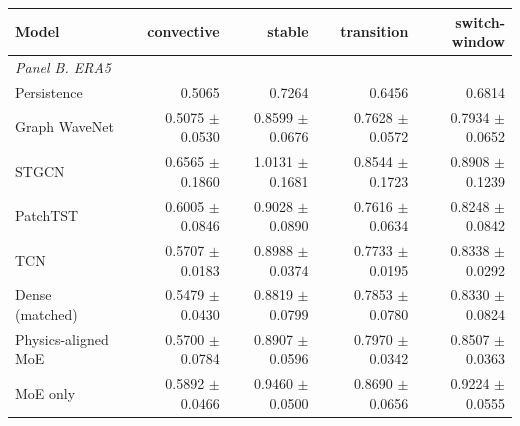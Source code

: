 \begin{table}[t]
\vspace{0.45em}
\begin{tabular}{lrrrr}
\toprule
Model & convective & stable & transition & switch-window \\
\midrule
\multicolumn{5}{l}{\textit{Panel B. ERA5}} \\
Persistence & 0.5065 & 0.7264 & 0.6456 & 0.6814 \\
Graph WaveNet & 0.5075 $\pm$ 0.0530 & 0.8599 $\pm$ 0.0676 & 0.7628 $\pm$ 0.0572 & 0.7934 $\pm$ 0.0652 \\
STGCN & 0.6565 $\pm$ 0.1860 & 1.0131 $\pm$ 0.1681 & 0.8544 $\pm$ 0.1723 & 0.8908 $\pm$ 0.1239 \\
PatchTST & 0.6005 $\pm$ 0.0846 & 0.9028 $\pm$ 0.0890 & 0.7616 $\pm$ 0.0634 & 0.8248 $\pm$ 0.0842 \\
TCN & 0.5707 $\pm$ 0.0183 & 0.8988 $\pm$ 0.0374 & 0.7733 $\pm$ 0.0195 & 0.8338 $\pm$ 0.0292 \\
Dense (matched) & 0.5479 $\pm$ 0.0430 & 0.8819 $\pm$ 0.0799 & 0.7853 $\pm$ 0.0780 & 0.8330 $\pm$ 0.0824 \\
Physics-aligned MoE & 0.5700 $\pm$ 0.0784 & 0.8907 $\pm$ 0.0596 & 0.7970 $\pm$ 0.0342 & 0.8507 $\pm$ 0.0363 \\
MoE only & 0.5892 $\pm$ 0.0466 & 0.9460 $\pm$ 0.0500 & 0.8690 $\pm$ 0.0656 & 0.9224 $\pm$ 0.0555 \\
\bottomrule
\end{tabular}
\end{table}

